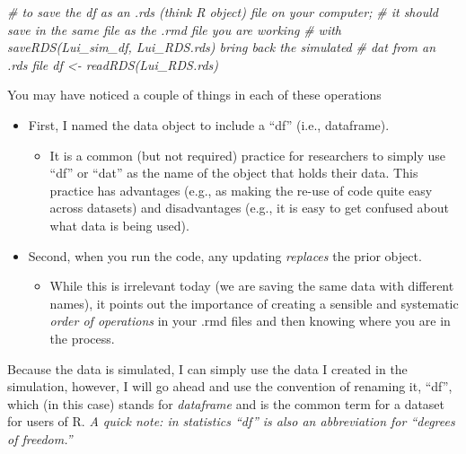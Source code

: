 \documentclass[
  11pt,
]{book}
\newenvironment{Shaded}{\begin{snugshade}}{\end{snugshade}}
\newcommand{\CommentTok}[1]{\textcolor[rgb]{0.37,0.37,0.37}{\textit{#1}}}
\providecommand{\tightlist}{%
  \setlength{\itemsep}{0pt}\setlength{\parskip}{0pt}}
\begin{document}
\begin{Shaded}
\begin{Highlighting}[]
\CommentTok{\# to save the df as an .rds (think \textquotesingle{}R object\textquotesingle{}) file on your computer;}
\CommentTok{\# it should save in the same file as the .rmd file you are working}
\CommentTok{\# with saveRDS(Lui\_sim\_df, \textquotesingle{}Lui\_RDS.rds\textquotesingle{}) bring back the simulated}
\CommentTok{\# dat from an .rds file df \textless{}{-} readRDS(\textquotesingle{}Lui\_RDS.rds\textquotesingle{})}
\end{Highlighting}
\end{Shaded}

You may have noticed a couple of things in each of these operations

\begin{itemize}
\tightlist
\item
  First, I named the data object to include a ``df'' (i.e., dataframe).

  \begin{itemize}
  \tightlist
  \item
    It is a common (but not required) practice for researchers to simply use ``df'' or ``dat'' as the name of the object that holds their data. This practice has advantages (e.g., as making the re-use of code quite easy across datasets) and disadvantages (e.g., it is easy to get confused about what data is being used).
  \end{itemize}
\item
  Second, when you run the code, any updating \emph{replaces} the prior object.

  \begin{itemize}
  \tightlist
  \item
    While this is irrelevant today (we are saving the same data with different names), it points out the importance of creating a sensible and systematic \emph{order of operations} in your .rmd files and then knowing where you are in the process.
  \end{itemize}
\end{itemize}

Because the data is simulated, I can simply use the data I created in the simulation, however, I will go ahead and use the convention of renaming it, ``df'', which (in this case) stands for \emph{dataframe} and is the common term for a dataset for users of R. \emph{A quick note: in statistics ``df'' is also an abbreviation for ``degrees of freedom.''}
\end{document}
